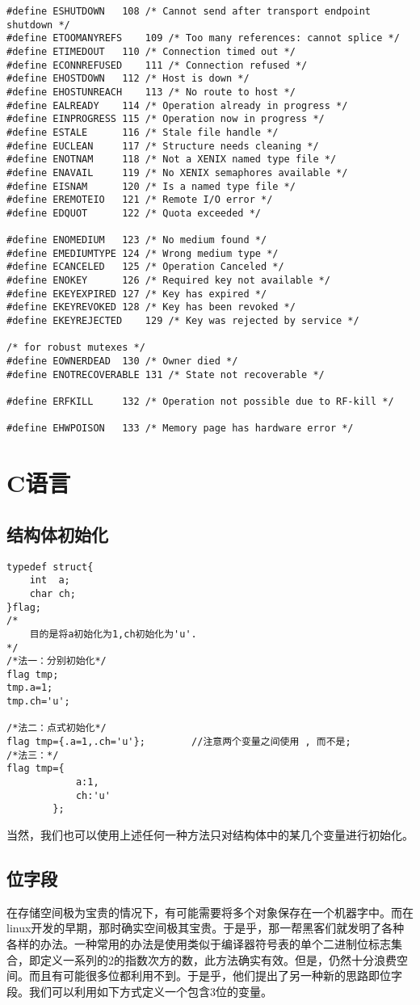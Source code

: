 \begin{verbatim}
#define	ESHUTDOWN	108	/* Cannot send after transport endpoint shutdown */
#define	ETOOMANYREFS	109	/* Too many references: cannot splice */
#define	ETIMEDOUT	110	/* Connection timed out */
#define	ECONNREFUSED	111	/* Connection refused */
#define	EHOSTDOWN	112	/* Host is down */
#define	EHOSTUNREACH	113	/* No route to host */
#define	EALREADY	114	/* Operation already in progress */
#define	EINPROGRESS	115	/* Operation now in progress */
#define	ESTALE		116	/* Stale file handle */
#define	EUCLEAN		117	/* Structure needs cleaning */
#define	ENOTNAM		118	/* Not a XENIX named type file */
#define	ENAVAIL		119	/* No XENIX semaphores available */
#define	EISNAM		120	/* Is a named type file */
#define	EREMOTEIO	121	/* Remote I/O error */
#define	EDQUOT		122	/* Quota exceeded */

#define	ENOMEDIUM	123	/* No medium found */
#define	EMEDIUMTYPE	124	/* Wrong medium type */
#define	ECANCELED	125	/* Operation Canceled */
#define	ENOKEY		126	/* Required key not available */
#define	EKEYEXPIRED	127	/* Key has expired */
#define	EKEYREVOKED	128	/* Key has been revoked */
#define	EKEYREJECTED	129	/* Key was rejected by service */

/* for robust mutexes */
#define	EOWNERDEAD	130	/* Owner died */
#define	ENOTRECOVERABLE	131	/* State not recoverable */

#define ERFKILL		132	/* Operation not possible due to RF-kill */

#define EHWPOISON	133	/* Memory page has hardware error */
\end{verbatim}

	\section{C语言}
		\subsection{结构体初始化}
\begin{verbatim}
typedef struct{
	int  a;
	char ch;
}flag;
/*
	目的是将a初始化为1,ch初始化为'u'.
*/
/*法一：分别初始化*/
flag tmp;
tmp.a=1;
tmp.ch='u';

/*法二：点式初始化*/
flag tmp={.a=1,.ch='u'};		//注意两个变量之间使用 , 而不是;
/*法三：*/
flag tmp={
			a:1,
			ch:'u'
		};
\end{verbatim}
			当然，我们也可以使用上述任何一种方法只对结构体中的某几个变量进行初始化。

		\subsection{位字段}
			在存储空间极为宝贵的情况下，有可能需要将多个对象保存在一个机器字中。而在linux开发的早期，那时确实空间极其宝贵。于是乎，那一帮黑客们就发明了各种各样的办法。一种常用的办法是使用类似于编译器符号表的单个二进制位标志集合，即定义一系列的2的指数次方的数，此方法确实有效。但是，仍然十分浪费空间。而且有可能很多位都利用不到。于是乎，他们提出了另一种新的思路即位字段。我们可以利用如下方式定义一个包含3位的变量。

